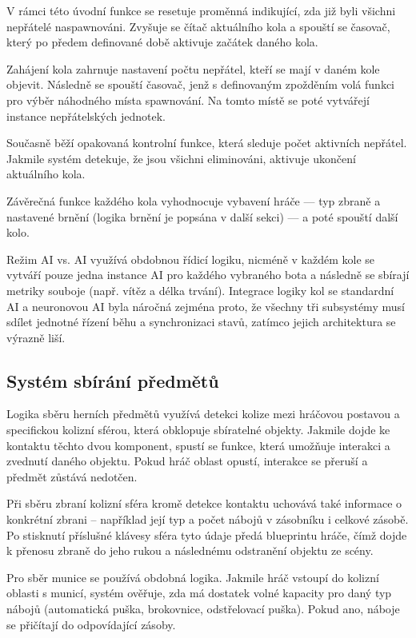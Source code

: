 V rámci této úvodní funkce se resetuje proměnná indikující, zda již byli všichni nepřátelé naspawnováni. Zvyšuje se čítač aktuálního kola a spouští se časovač, který po předem definované době aktivuje začátek daného kola.

Zahájení kola zahrnuje nastavení počtu nepřátel, kteří se mají v daném kole objevit. Následně se spouští časovač, jenž s definovaným zpožděním volá funkci pro výběr náhodného místa spawnování. Na tomto místě se poté vytvářejí instance nepřátelských jednotek.

Současně běží opakovaná kontrolní funkce, která sleduje počet aktivních nepřátel. Jakmile systém detekuje, že jsou všichni eliminováni, aktivuje ukončení aktuálního kola.

Závěrečná funkce každého kola vyhodnocuje vybavení hráče — typ zbraně a nastavené brnění (logika brnění je popsána v další sekci) — a poté spouští další kolo.

Režim AI vs. AI využívá obdobnou řídicí logiku, nicméně v každém kole se vytváří pouze jedna instance AI pro každého vybraného bota a následně se sbírají metriky souboje (např. vítěz a délka trvání). Integrace logiky kol se standardní AI a neuronovou AI byla náročná zejména proto, že všechny tři subsystémy musí sdílet jednotné řízení běhu a synchronizaci stavů, zatímco jejich architektura se výrazně liší.

\subsection{Systém sbírání předmětů}
Logika sběru herních předmětů využívá detekci kolize mezi hráčovou postavou a specifickou kolizní sférou, která obklopuje sbíratelné objekty. Jakmile dojde ke kontaktu těchto dvou komponent, spustí se funkce, která umožňuje interakci a zvednutí daného objektu. Pokud hráč oblast opustí, interakce se přeruší a předmět zůstává nedotčen.

Při sběru zbraní kolizní sféra kromě detekce kontaktu uchovává také informace o konkrétní zbrani – například její typ a počet nábojů v zásobníku i celkové zásobě. Po stisknutí příslušné klávesy sféra tyto údaje předá blueprintu hráče, čímž dojde k přenosu zbraně do jeho rukou a následnému odstranění objektu ze scény.

Pro sběr munice se používá obdobná logika. Jakmile hráč vstoupí do kolizní oblasti s municí, systém ověřuje, zda má dostatek volné kapacity pro daný typ nábojů (automatická puška, brokovnice, odstřelovací puška). Pokud ano, náboje se přičítají do odpovídající zásoby.


